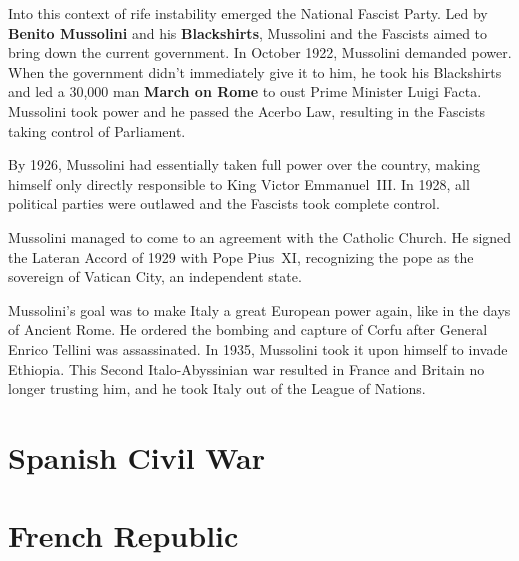 Into this context of rife instability emerged the National Fascist Party.
Led by \textbf{Benito Mussolini} and his \textbf{Blackshirts},
Mussolini and the Fascists aimed to bring down the current government.
In October 1922, Mussolini demanded power.
When the government didn't immediately give it to him,
he took his Blackshirts and led a 30,000 man \textbf{March on Rome} to oust Prime Minister Luigi Facta.
Mussolini took power and he passed the Acerbo Law, resulting in the Fascists taking control of Parliament.

By 1926, Mussolini had essentially taken full power over the country,
making himself only directly responsible to King Victor Emmanuel~III\@.
In 1928, all political parties were outlawed and the Fascists took complete control.

Mussolini managed to come to an agreement with the Catholic Church.
He signed the Lateran Accord of 1929 with Pope Pius~XI,
recognizing the pope as the sovereign of Vatican City, an independent state.

Mussolini's goal was to make Italy a great European power again, like in the days of Ancient Rome.
He ordered the bombing and capture of Corfu after General Enrico Tellini was assassinated.
In 1935, Mussolini took it upon himself to invade Ethiopia.
This Second Italo-Abyssinian war resulted in France and Britain no longer trusting him,
and he took Italy out of the League of Nations.

\section{Spanish Civil War}



\section{French Republic}
